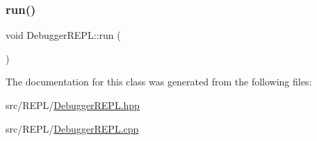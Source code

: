 \subsubsection{\texorpdfstring{run()}{run()}}
{\footnotesize\ttfamily void Debugger\+R\+E\+P\+L\+::run (\begin{DoxyParamCaption}{ }\end{DoxyParamCaption})}



The documentation for this class was generated from the following files\+:\begin{DoxyCompactItemize}
\item 
src/\+R\+E\+P\+L/\mbox{\hyperlink{_debugger_r_e_p_l_8hpp}{Debugger\+R\+E\+P\+L.\+hpp}}\item 
src/\+R\+E\+P\+L/\mbox{\hyperlink{_debugger_r_e_p_l_8cpp}{Debugger\+R\+E\+P\+L.\+cpp}}\end{DoxyCompactItemize}
